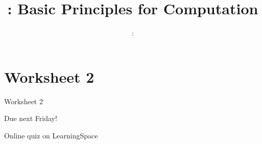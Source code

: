 \usepackage{../../beamerthemeFalmouthGamesAcademy}
\usepackage{multimedia}
\graphicspath{ {../../} }

\lstset{language=Python
}

\usepackage[normalem]{ulem}
\usepackage{wasysym}

\usepackage{pdfpages}

\usetikzlibrary{arrows,automata}




\title{\sessionnumber: Basic Principles for Computation}
\subtitle{\modulecode: \moduletitle}

\frame{\titlepage} 





\part{Worksheet 2}
\frame{\partpage}

\begin{frame}{Worksheet 2}
  \begin{center}
      Due next Friday!
      
      Online quiz on LearningSpace
  \end{center}
\end{frame}




